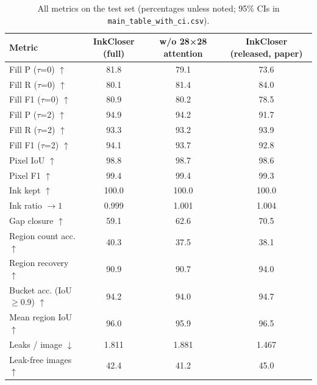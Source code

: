 \begin{table}[t]
\centering
\small
\begin{tabular}{lccc}
\toprule
Metric & InkCloser (full) & w/o 28×28 attention & InkCloser (released, paper) \\
\midrule
Fill P ($\tau$=0) $\uparrow$ & 81.8 & 79.1 & 73.6 \\
Fill R ($\tau$=0) $\uparrow$ & 80.1 & 81.4 & 84.0 \\
Fill F1 ($\tau$=0) $\uparrow$ & 80.9 & 80.2 & 78.5 \\
Fill P ($\tau$=2) $\uparrow$ & 94.9 & 94.2 & 91.7 \\
Fill R ($\tau$=2) $\uparrow$ & 93.3 & 93.2 & 93.9 \\
Fill F1 ($\tau$=2) $\uparrow$ & 94.1 & 93.7 & 92.8 \\
Pixel IoU $\uparrow$ & 98.8 & 98.7 & 98.6 \\
Pixel F1 $\uparrow$ & 99.4 & 99.4 & 99.3 \\
Ink kept $\uparrow$ & 100.0 & 100.0 & 100.0 \\
Ink ratio $\to 1$ & 0.999 & 1.001 & 1.004 \\
Gap closure $\uparrow$ & 59.1 & 62.6 & 70.5 \\
Region count acc. $\uparrow$ & 40.3 & 37.5 & 38.1 \\
Region recovery $\uparrow$ & 90.9 & 90.7 & 94.0 \\
Bucket acc. (IoU$\geq$0.9) $\uparrow$ & 94.2 & 94.0 & 94.7 \\
Mean region IoU $\uparrow$ & 96.0 & 95.9 & 96.5 \\
Leaks / image $\downarrow$ & 1.811 & 1.881 & 1.467 \\
Leak-free images $\uparrow$ & 42.4 & 41.2 & 45.0 \\
\bottomrule
\end{tabular}
\caption{All metrics on the test set (percentages unless noted; 95\% CIs in \texttt{main\_table\_with\_ci.csv}).}
\label{tab:all_results}
\end{table}